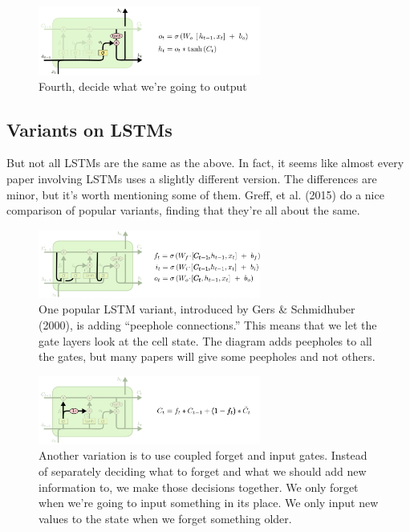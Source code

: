 \begin{figure}[h]
  \centering
  \includegraphics[width=0.65\textwidth]{Images/recurrent_neural_networks/23.png}
  \caption{Fourth, decide what we’re going to output}
\end{figure}

\subsection*{Variants on LSTMs}
But not all LSTMs are the same as the above. In fact, it seems like almost every paper involving LSTMs uses a slightly different version. The differences are minor, but it’s worth mentioning some of them. Greff, et al. (2015) do a nice comparison of popular variants, finding that they’re all about the same.

\begin{figure}[h]
  \centering
  \includegraphics[width=0.65\textwidth]{Images/recurrent_neural_networks/25.png}
  \caption{One popular LSTM variant, introduced by Gers \& Schmidhuber (2000), is adding ``peephole connections.” This means that we let the gate layers look at the cell state. The diagram adds peepholes to all the gates, but many papers will give some peepholes and not others.}
\end{figure}

\begin{figure}[h]
  \centering
  \includegraphics[width=0.65\textwidth]{Images/recurrent_neural_networks/26.png}
  \caption{Another variation is to use coupled forget and input gates. Instead of separately deciding what to forget and what we should add new information to, we make those decisions together. We only forget when we’re going to input something in its place. We only input new values to the state when we forget something older.}
\end{figure}

